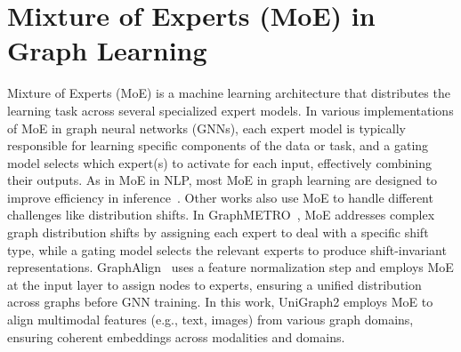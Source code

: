 \section{Mixture of Experts (MoE) in Graph Learning}
Mixture of Experts (MoE) is a machine learning architecture that distributes the learning task across several specialized expert models. In various implementations of MoE in graph neural networks (GNNs), each expert model is typically responsible for learning specific components of the data or task, and a gating model selects which expert(s) to activate for each input, effectively combining their outputs. As in MoE in NLP, most MoE in graph learning are designed to improve efficiency in inference~\cite{wang2024graph}. Other works also use MoE to handle different challenges like distribution shifts. In GraphMETRO~\cite{wu2023graphmetro}, MoE addresses complex graph distribution shifts by assigning each expert to deal with a specific shift type, while a gating model selects the relevant experts to produce shift-invariant representations. GraphAlign~\cite{hou2024graphalign} uses a feature normalization step and employs MoE at the input layer to assign nodes to experts, ensuring a unified distribution across graphs before GNN training. In this work, UniGraph2 employs MoE to align multimodal features (e.g., text, images) from various graph domains, ensuring coherent embeddings across modalities and domains.


